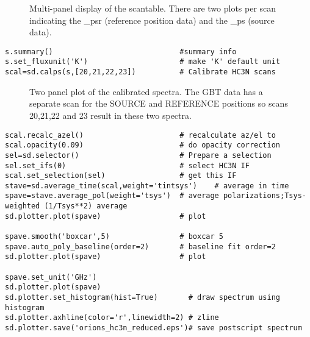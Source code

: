 \begin{figure}[h!]
\caption{\label{fig:scantable} Multi-panel display of the
  scantable. There are two plots per scan indicating the \_psr
  (reference position data) and the \_ps (source data).} 
\hrulefill
\end{figure}
 
\small
\begin{verbatim}
s.summary()                             #summary info                                   
s.set_fluxunit('K')                     # make 'K' default unit
scal=sd.calps(s,[20,21,22,23])          # Calibrate HC3N scans                          
\end{verbatim}
\normalsize

\begin{figure}[h!]
\caption{\label{fig:scal} Two panel plot of the calibrated
  spectra. The GBT data has a separate scan for the SOURCE and
  REFERENCE positions so scans 20,21,22 and 23 result in these two
  spectra.} 
\hrulefill
\end{figure}

\small
\begin{verbatim}
scal.recalc_azel()                      # recalculate az/el to                          
scal.opacity(0.09)                      # do opacity correction                         
sel=sd.selector()                       # Prepare a selection
sel.set_ifs(0)                          # select HC3N IF
scal.set_selection(sel)                 # get this IF
stave=sd.average_time(scal,weight='tintsys')    # average in time
spave=stave.average_pol(weight='tsys')  # average polarizations;Tsys-weighted (1/Tsys**2) average
sd.plotter.plot(spave)                  # plot

spave.smooth('boxcar',5)                # boxcar 5                                      
spave.auto_poly_baseline(order=2)       # baseline fit order=2                          
sd.plotter.plot(spave)                  # plot                                          

spave.set_unit('GHz')                                                                   
sd.plotter.plot(spave)
sd.plotter.set_histogram(hist=True)       # draw spectrum using histogram                 
sd.plotter.axhline(color='r',linewidth=2) # zline                                       
sd.plotter.save('orions_hc3n_reduced.eps')# save postscript spectrum                    
\end{verbatim}
\normalsize

